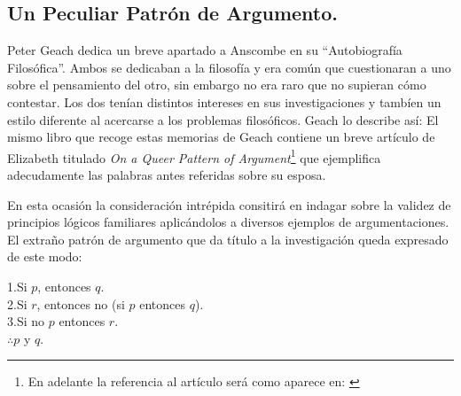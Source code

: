 \subsection{Un Peculiar Patrón de Argumento.}
Peter Geach dedica un breve apartado a Anscombe en su ``Autobiografía
Filosófica''. Ambos se dedicaban a la filosofía y era común que cuestionaran a
uno sobre el pensamiento del otro, sin embargo no era raro que no supieran cómo
contestar. Los dos tenían distintos intereses en sus investigaciones y tambíen
un estilo diferente al acercarse a los problemas filosóficos. Geach lo describe
así:  El mismo libro que recoge
estas memorias de Geach contiene un breve artículo de Elizabeth titulado
\emph{On a Queer Pattern of Argument}\footnote{\cite{anscombe1991aqp} En
  adelante la referencia al artículo será como aparece en:
  \cite{anscombe2015logic:qpa}} que ejemplifica adecudamente las palabras antes
referidas sobre su esposa.

En esta ocasión la consideración intrépida consitirá en indagar sobre la validez
de principios lógicos familiares aplicándolos a diversos ejemplos de
argumentaciones. El extraño patrón de argumento que da título a la investigación
queda expresado de este modo:
  \begin{adjustwidth}{1.2cm}{}
    1.\hspace{.459cm}Si $p$, entonces $q$.\\
    2.\hspace{.459cm}Si $r$, entonces no (si $p$ entonces $q$).\\
    3.\hspace{.459cm}Si no $p$ entonces $r$.\\
    $\therefore$\hspace{.459cm}$p$ y $q$.
  \end{adjustwidth}

